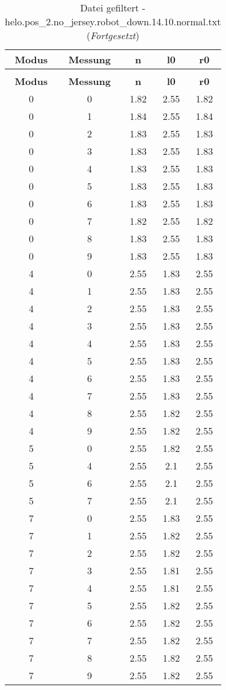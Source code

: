 \begin{longtable}{|c|c||c||c||c|}
	\caption{Datei gefiltert - helo.pos\_2.no\_jersey.robot\_down.14.10.normal.txt} \label{tab:helo.pos-2.no-jersey.robot-down.14.10.normal.txt} \\ \hline
	\textbf{Modus} & \textbf{Messung} & \textbf{n} & \textbf{l0} & \textbf{r0}\\ \hline
	\endfirsthead
	\caption[]{Datei gefiltert - helo.pos\_2.no\_jersey.robot\_down.14.10.normal.txt (\emph{Fortgesetzt})} \\ \hline
	\textbf{Modus} & \textbf{Messung} & \textbf{n} & \textbf{l0} & \textbf{r0}\\ \hline
	\endhead
	0 & 0 & 1.82 & 2.55 & 1.82 \\ \hline
	0 & 1 & 1.84 & 2.55 & 1.84 \\ \hline
	0 & 2 & 1.83 & 2.55 & 1.83 \\ \hline
	0 & 3 & 1.83 & 2.55 & 1.83 \\ \hline
	0 & 4 & 1.83 & 2.55 & 1.83 \\ \hline
	0 & 5 & 1.83 & 2.55 & 1.83 \\ \hline
	0 & 6 & 1.83 & 2.55 & 1.83 \\ \hline
	0 & 7 & 1.82 & 2.55 & 1.82 \\ \hline
	0 & 8 & 1.83 & 2.55 & 1.83 \\ \hline
	0 & 9 & 1.83 & 2.55 & 1.83 \\ \hline
	4 & 0 & 2.55 & 1.83 & 2.55 \\ \hline
	4 & 1 & 2.55 & 1.83 & 2.55 \\ \hline
	4 & 2 & 2.55 & 1.83 & 2.55 \\ \hline
	4 & 3 & 2.55 & 1.83 & 2.55 \\ \hline
	4 & 4 & 2.55 & 1.83 & 2.55 \\ \hline
	4 & 5 & 2.55 & 1.83 & 2.55 \\ \hline
	4 & 6 & 2.55 & 1.83 & 2.55 \\ \hline
	4 & 7 & 2.55 & 1.83 & 2.55 \\ \hline
	4 & 8 & 2.55 & 1.82 & 2.55 \\ \hline
	4 & 9 & 2.55 & 1.82 & 2.55 \\ \hline
	5 & 0 & 2.55 & 1.82 & 2.55 \\ \hline
	5 & 4 & 2.55 & 2.1 & 2.55 \\ \hline
	5 & 6 & 2.55 & 2.1 & 2.55 \\ \hline
	5 & 7 & 2.55 & 2.1 & 2.55 \\ \hline
	7 & 0 & 2.55 & 1.83 & 2.55 \\ \hline
	7 & 1 & 2.55 & 1.82 & 2.55 \\ \hline
	7 & 2 & 2.55 & 1.82 & 2.55 \\ \hline
	7 & 3 & 2.55 & 1.81 & 2.55 \\ \hline
	7 & 4 & 2.55 & 1.81 & 2.55 \\ \hline
	7 & 5 & 2.55 & 1.82 & 2.55 \\ \hline
	7 & 6 & 2.55 & 1.82 & 2.55 \\ \hline
	7 & 7 & 2.55 & 1.82 & 2.55 \\ \hline
	7 & 8 & 2.55 & 1.82 & 2.55 \\ \hline
	7 & 9 & 2.55 & 1.82 & 2.55 \\ \hline
\end{longtable}

